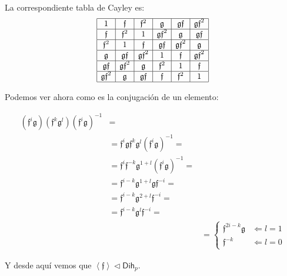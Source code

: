 \documentclass[12pt,a4paper,fleqn,spanish,final,openright]{extbook}
\theoremstyle{definition}
\theoremstyle{remark}
\begin{document}
La correspondiente tabla de Cayley es:
\begin{align*}
\begin{array}{|c|c|c|c|c|c|c|c|}
\hline
1&\mathfrak{f}&\mathfrak{f}^2&\mathfrak{g}&\mathfrak{gf}&\mathfrak{gf}^2\\
\hline
\mathfrak{f}&\mathfrak{f}^2&1&\mathfrak{gf}^2&\mathfrak{g}&\mathfrak{gf}\\
\hline
\mathfrak{f}^2&1&\mathfrak{f}&\mathfrak{gf}&\mathfrak{gf}^2&\mathfrak{g}\\
\hline
\mathfrak{g}&\mathfrak{gf}&\mathfrak{gf}^2&1&\mathfrak{f}&\mathfrak{gf}^2\\
\hline
\mathfrak{gf}&\mathfrak{gf}^2&\mathfrak{g}&\mathfrak{f}^2&1&\mathfrak{f}\\
\hline
\mathfrak{gf}^2&\mathfrak{g}&\mathfrak{gf}&\mathfrak{f}&\mathfrak{f}^2&1\\
\hline
\end{array}
\end{align*}

Podemos ver ahora como es la conjugación de un elemento:

\begin{align}
(\mathfrak{f}^i\mathfrak{g})(\mathfrak{f}^k\mathfrak{g}^l)(\mathfrak{f}^i\mathfrak{g})^{-1} &=&\\
&=\mathfrak{f}^i\mathfrak{g}\mathfrak{f}^k\mathfrak{g}^l(\mathfrak{f}^i\mathfrak{g})^{-1}=&\\
&=\mathfrak{f}^i\mathfrak{f}^{-k}\mathfrak{g}^{1+l}(\mathfrak{f}^i\mathfrak{g})^{-1}=&\\
&= \mathfrak{f}^{i-k}\mathfrak{g}^{1+l}\mathfrak{g} \mathfrak{f}^{-i} =& \\
&= \mathfrak{f}^{i-k}\mathfrak{g}^{2+l} \mathfrak{f}^{-i} =& \\
&= \mathfrak{f}^{i-k}\mathfrak{g}^{l} \mathfrak{f}^{-i} =& \\
&&=\begin{cases}
\mathfrak{f}^{2i-k} \mathfrak{g} & \Leftarrow l = 1\\
\mathfrak{f}^{-k} & \Leftarrow l = 0
\end{cases}
\end{align}

Y desde aquí vemos que $\left\langle \mathfrak f \right\rangle \lhd \mathsf{Dih}_{p}$.
\end{document}
